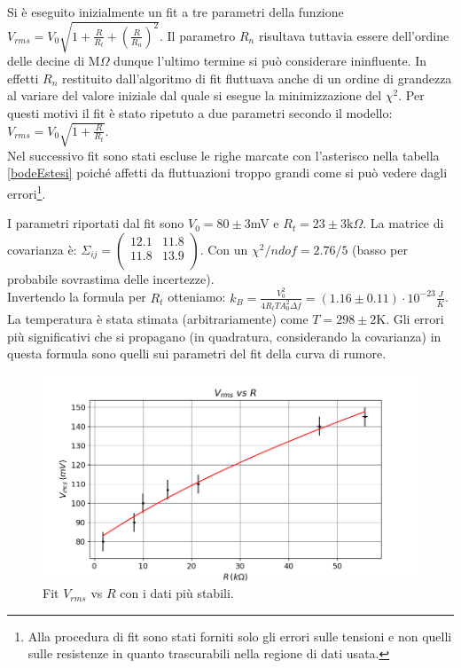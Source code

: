 \documentclass[10pt,a4paper]{article}
\begin{document}
Si è eseguito inizialmente un fit a tre parametri della funzione $V_{rms} = V_0 \sqrt{1+\frac{R}{R_t}+(\frac{R}{R_n})^2}$. Il parametro $R_n$ risultava tuttavia essere dell'ordine delle decine di $\mbox{M}\Omega$ dunque l'ultimo termine si può considerare ininfluente. In effetti $R_n$ restituito dall'algoritmo di fit fluttuava anche di un ordine di grandezza al variare del valore iniziale dal quale si esegue la minimizzazione del $\chi^2$. Per questi motivi il fit è stato ripetuto a due parametri secondo il modello: $V_{rms} = V_0 \sqrt{1+\frac{R}{R_t}}$.
\\
Nel successivo fit sono stati escluse le righe marcate con l'asterisco nella tabella \ref{bodeEstesi} poiché affetti da fluttuazioni troppo grandi come si può vedere dagli errori\footnote{Alla procedura di fit sono stati forniti solo gli errori sulle tensioni e non quelli sulle resistenze in quanto trascurabili nella regione di dati usata.}.

I parametri riportati dal fit sono $V_0 = 80 \pm 3$mV e $R_t = 23 \pm 3 \mbox{k}\Omega$. La matrice di covarianza è:  $\Sigma_{ij} = \left( \begin{array}{cc}
12.1 & 11.8\\ 
11.8 & 13.9\\
\end{array} \right)$. Con un $\chi^2/ndof = 2.76/5$ (basso per probabile sovrastima delle incertezze).\\
Invertendo la formula per $R_t$ otteniamo: $k_B = \frac{V_0^2}{4 R_t T A_0^2 \Delta f}=(1.16 \pm 0.11) \cdot 10^{-23} \frac{J}{K}$. La temperatura è stata stimata (arbitrariamente) come $T = 298 \pm 2$K. Gli errori più significativi che si propagano (in quadratura, considerando la covarianza) in questa formula sono quelli sui parametri del fit della curva di rumore.

\begin{figure}[!htb]
\centering
\includegraphics[scale=0.8]{boltzmann.png}
\caption{Fit $V_{rms}$ vs $R$ con i dati più stabili.\label{boltzmannFit}}
\end{figure}
\end{document}
